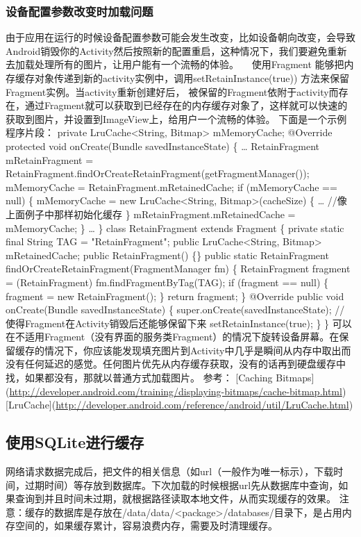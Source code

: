 \documentclass[9pt, b5paper]{article}
\begin{document}
\subsubsection{设备配置参数改变时加载问题}
\label{sec-8-2-3}
由于应用在运行的时候设备配置参数可能会发生改变，比如设备朝向改变，会导致Android销毁你的Activity然后按照新的配置重启，这种情况下，我们要避免重新去加载处理所有的图片，让用户能有一个流畅的体验。   
   　使用Fragment 能够把内存缓存对象传递到新的activity实例中，调用setRetainInstance(true)) 方法来保留Fragment实例。当activity重新创建好后， 被保留的Fragment依附于activity而存在，通过Fragment就可以获取到已经存在的内存缓存对象了，这样就可以快速的获取到图片，并设置到ImageView上，给用户一个流畅的体验。
下面是一个示例程序片段：
private LruCache<String, Bitmap> mMemoryCache;
@Override
protected void onCreate(Bundle savedInstanceState) \{
    \ldots{}
RetainFragment mRetainFragment =            RetainFragment.findOrCreateRetainFragment(getFragmentManager());
    mMemoryCache = RetainFragment.mRetainedCache;
    if (mMemoryCache == null) \{
        mMemoryCache = new LruCache<String, Bitmap>(cacheSize) \{
            \ldots{} //像上面例子中那样初始化缓存
        \}
        mRetainFragment.mRetainedCache = mMemoryCache;
    \}
    \ldots{}
\}
class RetainFragment extends Fragment \{
    private static final String TAG = "RetainFragment";
    public LruCache<String, Bitmap> mRetainedCache;
    public RetainFragment() \{\}
    public static RetainFragment findOrCreateRetainFragment(FragmentManager fm) \{
        RetainFragment fragment = (RetainFragment) fm.findFragmentByTag(TAG);
        if (fragment == null) \{
            fragment = new RetainFragment();
        \}
        return fragment;
    \}
    @Override
    public void onCreate(Bundle savedInstanceState) \{
        super.onCreate(savedInstanceState);
        // 使得Fragment在Activity销毁后还能够保留下来
        setRetainInstance(true);
    \}
\}
可以在不适用Fragment（没有界面的服务类Fragment）的情况下旋转设备屏幕。在保留缓存的情况下，你应该能发现填充图片到Activity中几乎是瞬间从内存中取出而没有任何延迟的感觉。任何图片优先从内存缓存获取，没有的话再到硬盘缓存中找，如果都没有，那就以普通方式加载图片。
参考：
[Caching Bitmaps](\url{http://developer.android.com/training/displaying-bitmaps/cache-bitmap.html})
[LruCache](\url{http://developer.android.com/reference/android/util/LruCache.html})
\subsection{使用SQLite进行缓存}
\label{sec-8-3}
网络请求数据完成后，把文件的相关信息（如url（一般作为唯一标示），下载时间，过期时间）等存放到数据库。下次加载的时候根据url先从数据库中查询，如果查询到并且时间未过期，就根据路径读取本地文件，从而实现缓存的效果。
注意：缓存的数据库是存放在/data/data/<package>/databases/目录下，是占用内存空间的，如果缓存累计，容易浪费内存，需要及时清理缓存。
\end{document}
